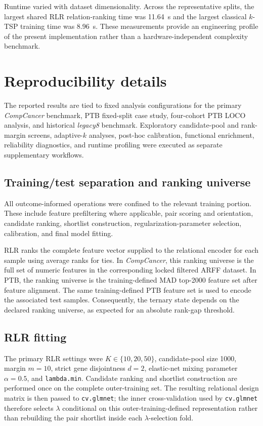 \documentclass[11pt, a4paper]{article}
\begin{document}
Runtime varied with dataset dimensionality. Across the representative splits, the largest shared RLR relation-ranking time was 11.64~s and the largest classical $k$-TSP training time was 8.96~s. These measurements provide an engineering profile of the present implementation rather than a hardware-independent complexity benchmark.

\section{Reproducibility details}

The reported results are tied to fixed analysis configurations for the primary \emph{CompCancer} benchmark, PTB fixed-split case study, four-cohort PTB LOCO analysis, and historical \emph{legacy8} benchmark. Exploratory candidate-pool and rank-margin screens, adaptive-$k$ analyses, post-hoc calibration, functional enrichment, reliability diagnostics, and runtime profiling were executed as separate supplementary workflows.

\subsection*{Training/test separation and ranking universe}

All outcome-informed operations were confined to the relevant training portion. These include feature prefiltering where applicable, pair scoring and orientation, candidate ranking, shortlist construction, regularization-parameter selection, calibration, and final model fitting.

RLR ranks the complete feature vector supplied to the relational encoder for each sample using average ranks for ties. In \emph{CompCancer}, this ranking universe is the full set of numeric features in the corresponding locked filtered ARFF dataset. In PTB, the ranking universe is the training-defined MAD top-2000 feature set after feature alignment. The same training-defined PTB feature set is used to encode the associated test samples. Consequently, the ternary state depends on the declared ranking universe, as expected for an absolute rank-gap threshold.

\subsection*{RLR fitting}

The primary RLR settings were $K\in\{10,20,50\}$, candidate-pool size 1000, margin $m=10$, strict gene disjointness $d=2$, elastic-net mixing parameter $\alpha=0.5$, and \texttt{lambda.min}. Candidate ranking and shortlist construction are performed once on the complete outer-training set. The resulting relational design matrix is then passed to \texttt{cv.glmnet}; the inner cross-validation used by \texttt{cv.glmnet} therefore selects $\lambda$ conditional on this outer-training-defined representation rather than rebuilding the pair shortlist inside each $\lambda$-selection fold.
\end{document}

